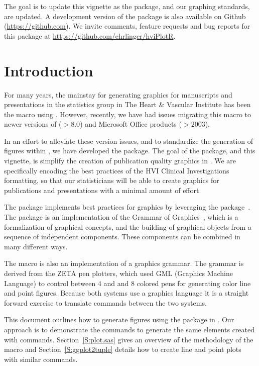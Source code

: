 \documentclass[nojss]{jss}\usepackage[]{graphicx}\usepackage[]{color}
\begin{document}
The goal is to update this vignette as the package, and our graphing standards, are updated. A development version of the  package is also available on Github (\url{https://github.com}). We invite comments, feature requests and bug reports for this package at \url{https://github.com/ehrlinger/hviPlotR}.

\section{Introduction}
For many years, the mainstay for generating graphics for manuscripts and presentations in the statistics group in The Heart \& Vascular Institute has been the  macro using . However, recently, we have had issues migrating this macro to newer versions of  ($> 8.0$) and Microsoft Office products ($> 2003$). 

In an effort to alleviate these version issues, and to standardize the generation of figures within , we have developed the   package. The goal of the package, and this vignette, is simplify the creation of publication quality graphics in  . We are specifically encoding the best practices of the HVI Clinical Investigations formatting, so that our statisticians will be able to create graphics for publications and presentations with a minimal amount of effort.

The  package implements best practices for  graphics by leveraging the  package~\citep{Wickham:2009}. The  package is an implementation of the Grammar of Graphics~\citep{Wilkinson:2005}, which is a formalization of graphical concepts, and the building of graphical objects from a sequence of independent components. These components can be combined in many different ways.

The  macro is also an implementation of a graphics grammar. The grammar  is derived from the ZETA pen plotters, which used GML (Graphics Machine Language) to control between 4 and and 8 colored pens for generating color line and point figures. Because both systems use a graphics language it is a straight forward exercise to translate commands between the two systems. 

This document outlines how to generate figures using the  package in . Our approach is to demonstrate the  commands to generate the same elements created with  commands. Section~\ref{S:plot.sas} gives an overview of the methodology of the  macro and Section~\ref{S:ggplot2tuple} details how to create line and point plots with similar  commands. 
\end{document}
